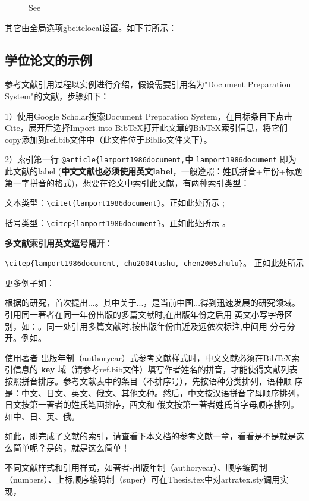 \documentclass[twoside]{article}
\begin{document}
\begin{figure}[!htbp]
  \centering
    {See{\cite{walls2013drought}
    \cite{betts2005aging}}}\label{fig:bi:lang2}
\end{figure}

    其它由全局选项gbcitelocal设置。如下节所示：

\subsection{学位论文的示例}

参考文献引用过程以实例进行介绍，假设需要引用名为"Document Preparation System"的文献，步骤如下：

1）使用Google Scholar搜索Document Preparation System，在目标条目下点击Cite，展开后选择Import into BibTeX打开此文章的BibTeX索引信息，将它们copy添加到ref.bib文件中（此文件位于Biblio文件夹下）。

2）索引第一行 \verb|@article{lamport1986document,|中 \verb|lamport1986document| 即为此文献的label (\textbf{中文文献也必须使用英文label}，一般遵照：姓氏拼音+年份+标题第一字拼音的格式)，想要在论文中索引此文献，有两种索引类型：

文本类型：\verb|\citet{lamport1986document}|。正如此处所示 \textcite{lamport1986document};

括号类型：\verb|\citep{lamport1986document}|。正如此处所示 \cite{lamport1986document}。

\textbf{多文献索引用英文逗号隔开}：

\verb|\citep{lamport1986document, chu2004tushu, chen2005zhulu}|。
正如此处所示 \cite{lamport1986document, chu2004tushu, chen2005zhulu}

更多例子如：

\textcite{walls2013drought}根据\textcite{betts2005aging}的研究，首次提出...。其中关于...\cite{walls2013drought,betts2005aging}，是当前中国...得到迅速发展的研究领域\cite{chen1980zhongguo, bravo1990comparative}。引用同一著者在同一年份出版的多篇文献时,在出版年份之后用
英文小写字母区别，如：\cite{yuan2012lana, yuan2012lanb, yuan2012lanc}。同一处引用多篇文献时,按出版年份由近及远依次标注,中间用
分号分开。例如\cite{chen1980zhongguo,stamerjohanns2009mathml,hls2012jinji,niu2013zonghe}。

使用著者-出版年制（authoryear）式参考文献样式时，中文文献必须在BibTeX索引信息的 \textbf{key} 域（请参考ref.bib文件）填写作者姓名的拼音，才能使得文献列表按照拼音排序。参考文献表中的条目（不排序号），先按语种分类排列，语种顺 序是：中文、日文、英文、俄文、其他文种。然后，中文按汉语拼音字母顺序排列，日文按第一著者的姓氏笔画排序，西文和 俄文按第一著者姓氏首字母顺序排列。
如中\cite{niu2013zonghe}、日\cite{Bohan1928}、英\cite{stamerjohanns2009mathml}、俄\cite{Dubrovin1906}。

如此，即完成了文献的索引，请查看下本文档的参考文献一章，看看是不是就是这么简单呢？是的，就是这么简单！

不同文献样式和引用样式，如著者-出版年制（authoryear）、顺序编码制（numbers）、上标顺序编码制（super）可在Thesis.tex中对artratex.sty调用实现，

    \printbibliography

    
\end{document}
